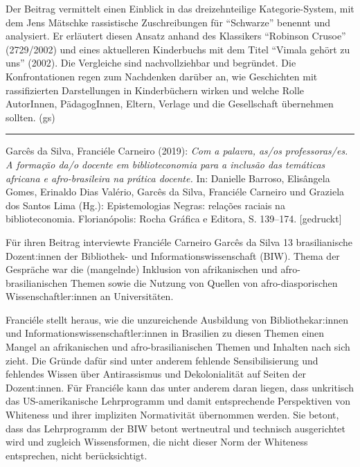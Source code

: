 \documentclass[a4paper,
fontsize=11pt,
oneside,
numbers=noperiodatend,
parskip=half-,
bibliography=totoc,
final
]{scrartcl}
\begin{document}
Der Beitrag vermittelt einen Einblick in das dreizehnteilige
Kategorie-System, mit dem Jens Mätschke rassistische Zuschreibungen für
\enquote{Schwarze} benennt und analysiert. Er erläutert diesen Ansatz
anhand des Klassikers \enquote{Robinson Crusoe} (2729/2002) und eines
aktuelleren Kinderbuchs mit dem Titel \enquote{Vimala gehört zu uns}
(2002). Die Vergleiche sind nachvollziehbar und begründet. Die
Konfrontationen regen zum Nachdenken darüber an, wie Geschichten mit
rassifizierten Darstellungen in Kinderbüchern wirken und welche Rolle
AutorInnen, PädagogInnen, Eltern, Verlage und die Gesellschaft
übernehmen sollten. (gs)

\begin{center}\rule{0.5\linewidth}{0.5pt}\end{center}

\pagebreak

Garcês da Silva, Franciéle Carneiro (2019): \emph{Com a palavra, as/os
professoras/es. A formação da/o docente em biblioteconomia para a
inclusão das temáticas africana e afro-brasileira na prática docente.}
In: Danielle Barroso, Elisângela Gomes, Erinaldo Dias Valério, Garcês da
Silva, Franciéle Carneiro und Graziela dos Santos Lima (Hg.):
Epistemologias Negras: relações raciais na biblioteconomia.
Florianópolis: Rocha Gráfica e Editora, S. 139--174. {[}gedruckt{]}

Für ihren Beitrag interviewte Franciéle Carneiro Garcês da Silva 13
brasilianische Dozent:innen der Bibliothek- und Informationswissenschaft
(BIW). Thema der Gespräche war die (mangelnde) Inklusion von
afrikanischen und afro-brasilianischen Themen sowie die Nutzung von
Quellen von afro-diasporischen Wissenschaftler:innen an Universitäten.

Franciéle stellt heraus, wie die unzureichende Ausbildung von
Bibliothekar:innen und Informationswissenschaftler:innen in Brasilien zu
diesen Themen einen Mangel an afrikanischen und afro-brasilianischen
Themen und Inhalten nach sich zieht. Die Gründe dafür sind unter anderem
fehlende Sensibilisierung und fehlendes Wissen über Antirassismus und
Dekolonialität auf Seiten der Dozent:innen. Für Franciéle kann das unter
anderem daran liegen, dass unkritisch das US-amerikanische Lehrprogramm
und damit entsprechende Perspektiven von Whiteness und ihrer impliziten
Normativität übernommen werden. Sie betont, dass das Lehrprogramm der
BIW betont wertneutral und technisch ausgerichtet wird und zugleich
Wissensformen, die nicht dieser Norm der Whiteness entsprechen, nicht
berücksichtigt.
\end{document}
